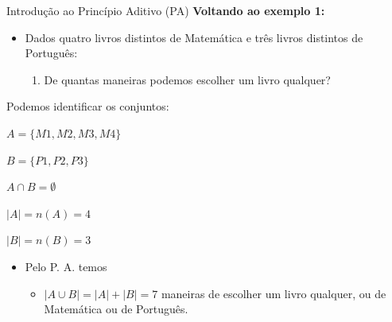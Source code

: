 \documentclass[aspectratio=169]{beamer}
\begin{document}
\begin{frame}{Introdução ao Princípio Aditivo (PA)}
    \textbf{Voltando ao exemplo 1:}

    \vspace{4mm}
    \begin{itemize}
        \item Dados quatro livros distintos de Matemática e três livros distintos de Português:
        \begin{enumerate}[a]
            \item De quantas maneiras podemos escolher um livro qualquer?
        \end{enumerate}
    \end{itemize}

    \vspace{3mm}
    Podemos identificar os conjuntos:
    \begin{center}
        \begin{multicols}{2}
            $A = \{ M1, M2, M3, M4 \} $
            
            \columnbreak
    
            $B = \{ P1, P2, P3 \}$    
        \end{multicols}
    \end{center}


    \begin{center}
        \begin{multicols}{3}
            $A \cap B= \emptyset $ 

            \columnbreak

            $|A| = n(A) = 4$

            \columnbreak

            $|B| = n(B) = 3$
        \end{multicols}
    \end{center}

    \begin{itemize}
        \item Pelo P. A. temos
        \begin{itemize}
            \item[] $|A \cup B| = |A| + |B| = 7$ maneiras de escolher um livro qualquer, ou de Matemática ou de Português. 
        \end{itemize}
    \end{itemize}
\end{frame}
\end{document}
